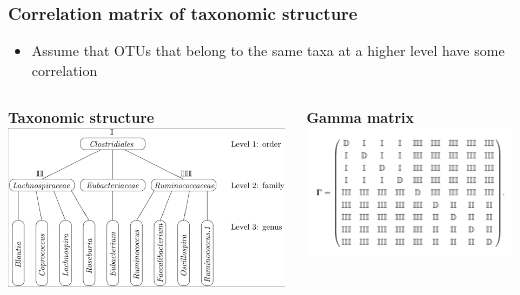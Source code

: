 \documentclass{beamer}
\begin{document}
\begin{frame}
\frametitle{Correlation matrix of taxonomic structure}
\begin{itemize}
  \item Assume that OTUs that belong to the same taxa at a higher level have some correlation
\end{itemize}
\begin{columns}[c] %

\textbf{Taxonomic structure}
\includegraphics[width = \textwidth]{tax_tree.png}

\textbf{Gamma matrix}
\includegraphics[width = \textwidth]{gamma.png}
\end{columns}
\end{frame}
\end{document}
